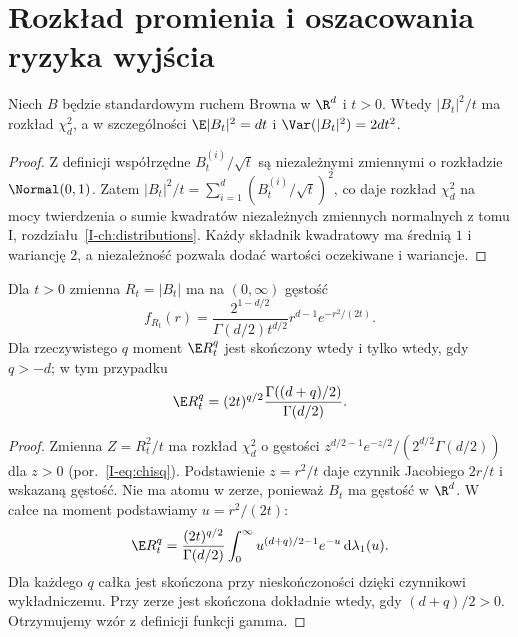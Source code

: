 \section{Rozkład promienia i oszacowania ryzyka wyjścia}
\begin{twierdzenie}
Niech $B$ będzie standardowym ruchem Browna w $\R^d$
i $t>0$. Wtedy $|B_t|^2/t$ ma rozkład $\chi^2_d$,
a w szczególności
$\E|B_t|^2=dt$ i $\Var(|B_t|^2)=2dt^2$.
\end{twierdzenie}
\begin{proof}
Z definicji współrzędne $B_t^{(i)}/\sqrt t$ są niezależnymi
zmiennymi o rozkładzie $\Normal(0,1)$. Zatem
$|B_t|^2/t=\sum_{i=1}^d(B_t^{(i)}/\sqrt t)^2$,
co daje rozkład $\chi^2_d$ na mocy twierdzenia
o sumie kwadratów niezależnych zmiennych normalnych
z tomu I, rozdziału~\ref{I-ch:distributions}.
Każdy składnik kwadratowy ma średnią $1$ i wariancję $2$,
a niezależność pozwala dodać wartości oczekiwane
i wariancje.
\end{proof}

\begin{wniosek}
Dla $t>0$ zmienna $R_t=|B_t|$ ma na $(0,\infty)$
gęstość
\[
f_{R_t}(r)=
\frac{2^{1-d/2}}{\Gamma(d/2)t^{d/2}}
r^{d-1}e^{-r^2/(2t)}.
\]
Dla rzeczywistego $q$ moment $\E R_t^q$ jest
skończony wtedy i tylko wtedy, gdy $q>-d$;
w tym przypadku
\[
\E R_t^q=(2t)^{q/2}
\frac{\Gamma((d+q)/2)}{\Gamma(d/2)}.
\]
\end{wniosek}
\begin{proof}
Zmienna $Z=R_t^2/t$ ma rozkład $\chi_d^2$
o gęstości
$z^{d/2-1}e^{-z/2}/(2^{d/2}\Gamma(d/2))$ dla $z>0$
(por.~\eqref{I-eq:chisq}).
Podstawienie $z=r^2/t$ daje czynnik Jacobiego
$2r/t$ i wskazaną gęstość. Nie ma atomu w zerze,
ponieważ $B_t$ ma gęstość w $\R^d$.
W całce na moment podstawiamy $u=r^2/(2t)$:
\[
\E R_t^q=\frac{(2t)^{q/2}}{\Gamma(d/2)}
\int_0^\infty u^{(d+q)/2-1}e^{-u}\,\mathrm d\lambda_1(u).
\]
Dla każdego $q$ całka jest skończona przy
nieskończoności dzięki czynnikowi wykładniczemu.
Przy zerze jest skończona dokładnie wtedy,
gdy $(d+q)/2>0$. Otrzymujemy wzór z definicji
funkcji gamma.
\end{proof}

